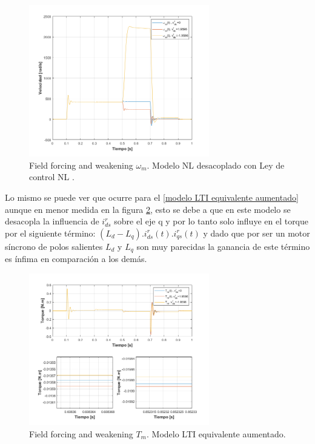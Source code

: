 \documentclass[10pt]{article}
\begin{document}
\begin{itemize}
	\begin{figure}[h!]
	\centering
	\includegraphics[width=0.7\textwidth]{wdistintode0.png}
	\caption{\label{fig:wdistintode0} Field forcing and weakening $\omega_{m}$. Modelo NL desacoplado con Ley de control NL .}
	\end{figure}
	
	Lo mismo se puede ver que ocurre para el \ref{modelo LTI equivalente aumentado} aunque en menor medida en la figura \ref{fig:Tdistintode0LTI}, esto se debe a que en este modelo se desacopla la influencia de $i^{r}_{ds}$ sobre el eje q y por lo tanto solo influye en el torque por el siguiente término: $(L_{d}-L_{q}).i^{r}_{ds}(t).i^{r}_{qs}(t)$ y dado que por ser un motor síncrono de polos salientes $L_{d}$ y $L_{q}$ son muy parecidas la ganancia de este término es ínfima en comparación a los demás.
	
	\begin{figure}[h!]
	\centering
	\includegraphics[width=0.7\textwidth]{Tdistintode0LTI.png}
	\caption{\label{fig:Tdistintode0LTI} Field forcing and weakening $T_{m}$. Modelo LTI equivalente aumentado.}
	\end{figure}
\end{itemize}
\end{document}
